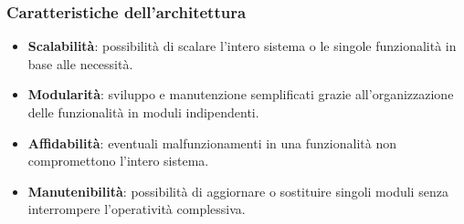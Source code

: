 \subsubsection{Caratteristiche dell’architettura}

\begin{itemize}
\item \textbf{Scalabilità}: possibilità di scalare l’intero sistema o le singole funzionalità in base alle necessità.
\item \textbf{Modularità}: sviluppo e manutenzione semplificati grazie all’organizzazione delle funzionalità in moduli indipendenti.
\item \textbf{Affidabilità}: eventuali malfunzionamenti in una funzionalità non compromettono l’intero sistema.
\item \textbf{Manutenibilità}: possibilità di aggiornare o sostituire singoli moduli senza interrompere l’operatività complessiva.
\end{itemize}